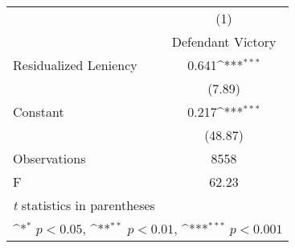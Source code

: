 {
\def\sym#1{\ifmmode^{#1}\else\(^{#1}\)\fi}
\begin{tabular}{l*{1}{c}}
\toprule
                    &\multicolumn{1}{c}{(1)}         \\
                    &Defendant Victory         \\
\midrule
Residualized Leniency&       0.641\sym{***}\\
                    &      (7.89)         \\
\addlinespace
Constant            &       0.217\sym{***}\\
                    &     (48.87)         \\
\midrule
Observations        &        8558         \\
F                   &       62.23         \\
\bottomrule
\multicolumn{2}{l}{\footnotesize \textit{t} statistics in parentheses}\\
\multicolumn{2}{l}{\footnotesize \sym{*} \(p<0.05\), \sym{**} \(p<0.01\), \sym{***} \(p<0.001\)}\\
\end{tabular}
}
